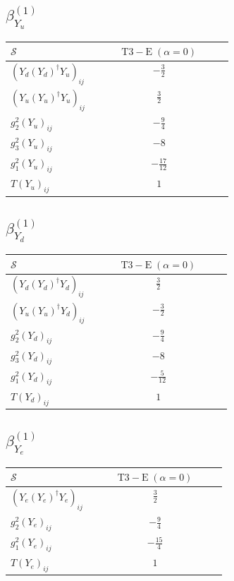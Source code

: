 \documentclass[9pt]{article}
\begin{document}
\subsection*{$ \beta_{Y_u}^{(1)} $}
\begin{longtable}{@{}p{0.38\linewidth}c@{}}
\toprule
$\mathcal{S}$ & $ \mathrm{T3-E}\;(\alpha=0) $ \\
\midrule
$ (Y_d (Y_d)^{\dagger} Y_u)_{ij} $ & $ - \frac{3}{2} $ \\
$ (Y_u (Y_u)^{\dagger} Y_u)_{ij} $ & $ \frac{3}{2} $ \\
$ g_2^2 (Y_u)_{ij} $ & $ - \frac{9}{4} $ \\
$ g_3^2 (Y_u)_{ij} $ & $ -8 $ \\
$ g_1^2 (Y_u)_{ij} $ & $ - \frac{17}{12} $ \\
$ T (Y_u)_{ij} $ & $ 1 $ \\
\bottomrule
\end{longtable}
\subsection*{$ \beta_{Y_d}^{(1)} $}
\begin{longtable}{@{}p{0.38\linewidth}c@{}}
\toprule
$\mathcal{S}$ & $ \mathrm{T3-E}\;(\alpha=0) $ \\
\midrule
$ (Y_d (Y_d)^{\dagger} Y_d)_{ij} $ & $ \frac{3}{2} $ \\
$ (Y_u (Y_u)^{\dagger} Y_d)_{ij} $ & $ - \frac{3}{2} $ \\
$ g_2^2 (Y_d)_{ij} $ & $ - \frac{9}{4} $ \\
$ g_3^2 (Y_d)_{ij} $ & $ -8 $ \\
$ g_1^2 (Y_d)_{ij} $ & $ - \frac{5}{12} $ \\
$ T (Y_d)_{ij} $ & $ 1 $ \\
\bottomrule
\end{longtable}
\subsection*{$ \beta_{Y_e}^{(1)} $}
\begin{longtable}{@{}p{0.38\linewidth}c@{}}
\toprule
$\mathcal{S}$ & $ \mathrm{T3-E}\;(\alpha=0) $ \\
\midrule
$ (Y_e (Y_e)^{\dagger} Y_e)_{ij} $ & $ \frac{3}{2} $ \\
$ g_2^2 (Y_e)_{ij} $ & $ - \frac{9}{4} $ \\
$ g_1^2 (Y_e)_{ij} $ & $ - \frac{15}{4} $ \\
$ T (Y_e)_{ij} $ & $ 1 $ \\
\bottomrule
\end{longtable}
\end{document}
